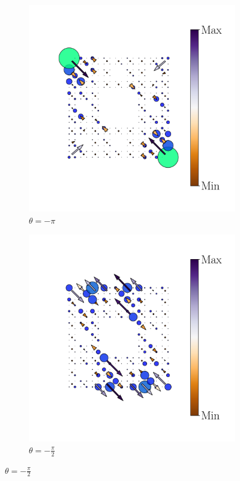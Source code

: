 \begin{figure}[tbh!]
     
     \begin{minipage}[h!]{1.0\textwidth}
          \begin{subfigure}[b!]{0.2 \textwidth}
             \caption{$\theta = -\pi$}
             \includegraphics[width=\textwidth]{Imagenes/Resultados_pump_Fractal/x/hoti_pomp_x_neg1.pdf}
         \end{subfigure}\hspace*{-0.5em}
          \begin{subfigure}[b!]{0.2 \textwidth}
             \caption*{$\theta = -\frac{\pi}{2}$}
             \includegraphics[width=\textwidth]{Imagenes/Resultados_pump_Fractal/x/hoti_pomp_x_neg2.pdf}

\end{subfigure}
\end{minipage}
\end{figure}
